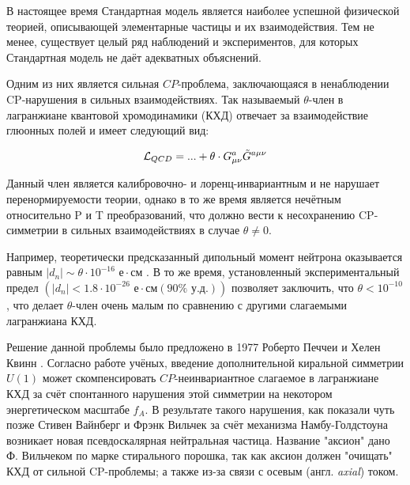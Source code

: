 \documentclass[a4paper,article,14pt]{extarticle}
\begin{document}

\tableofcontents
\pagebreak



В настоящее время Стандартная модель является наиболее успешной физической теорией, описывающей элементарные частицы и их взаимодействия. Тем не менее, существует целый ряд наблюдений и экспериментов, для которых Стандартная модель не даёт адекватных объяснений. 

Одним из них является сильная $CP$-проблема, заключающаяся в ненаблюдении CP-нарушения в сильных взаимодействиях. Так называемый $\theta$-член в лагранжиане квантовой хромодинамики (КХД) отвечает за взаимодействие глюонных полей и имеет следующий вид:

\begin{equation}
 {\cal L}_{QCD}  =  ... + \theta  \cdot G_{\mu \nu }^a {\tilde G^{a \mu \nu }}
\label{eq:lagrangian}
\end{equation}

Данный член является калибровочно- и лоренц-инвариантным и не нарушает перенормируемости теории, однако в то же время является нечётным относительно P и T преобразований, что должно вести к несохранению CP-симметрии в сильных взаимодействиях в случае $\theta \neq 0$. 

Например, теоретически предсказанный дипольный момент нейтрона оказывается равным $\left|{d_n} \right| \sim \theta  \cdot {10^{ - 16}} \text{ е} \cdot \text{см} $ \cite{NDMtheory}. В то же время, установленный экспериментальный предел $ \left( \left| {{d_n}} \right| < 1.8 \cdot {10^{ - 26}} \text{ е} \cdot \text{см}\left( {90\% \text{ у.д.}} \right) \right)$ \cite{NDMexperiment} позволяет заключить, что $\theta < 10^{-10}$, что делает $\theta$-член очень малым по сравнению с другими слагаемыми лагранжиана КХД.

Решение данной проблемы было предложено в 1977 Роберто Печчеи и Хелен Квинн \cite{PQ}. Согласно работе учёных, введение дополнительной киральной симметрии $U{\left( 1 \right)}$ может скомпенсировать $CP$-неинвариантное слагаемое в лагранжиане КХД за счёт спонтанного нарушения этой симметрии на некотором энергетическом масштабе $f_A$. В результате такого нарушения, как показали чуть позже Стивен Вайнберг \cite{Weinberg} и Фрэнк Вильчек \cite{Wilczek} за счёт механизма Намбу-Голдстоуна возникает новая псевдоскалярная нейтральная частица. Название "аксион" дано Ф. Вильчеком по марке стирального порошка, так как аксион должен "очищать" КХД от сильной CP-проблемы; а также из-за связи с осевым (англ. \textit{axial}) током. 
\end{document}
